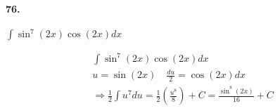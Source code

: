 


\renewcommand\assignment{Homework Set VI, Due Friday, February 17, 2023: \S 3.2 \# 76, 86 \S 3.3 \# 134, 138, 146}


    \iffalse
    \begin{equation*}
        \begin{gathered}
            Equations go here.
        \end{gathered}
    \end{equation*}

    \resizebox{\hsize}{!}{$Long equation goes here$}

    \begin{multicol*}{# of columns}
    \end{multicol*}

    \horizontal

    \fi


    \paragraph*{76.} 
    $\int\sin^7(2x)\cos(2x)dx$
    \\
    \begin{mdframed}
        \begin{equation*}
            \begin{gathered}
                \int\sin^7(2x)\cos(2x)dx                        \\
                u = \sin(2x) \quad \frac{du}{2} = \cos(2x)dx    \\
                \Rightarrow \frac{1}{2} \int u^7du              
                = \frac{1}{2}\left(\frac{u^8}{8}\right) + C     
                = \boxed{\frac{\sin^8(2x)}{16} + C}
            \end{gathered}
        \end{equation*}
    \end{mdframed}

